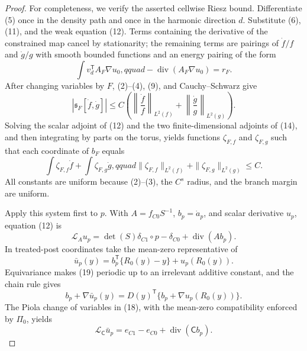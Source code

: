 \documentclass{article}
\begin{document}
\begin{proof}
For completeness, we verify the asserted cellwise Riesz bound.  Differentiate (5) once in the density path and once in the harmonic direction \(d\).  Substitute (6), (11), and the weak equation (12).  Terms containing the derivative of the constrained map cancel by stationarity; the remaining terms are pairings of \(\dot f/f\) and \(\dot g/g\) with smooth bounded functions and an energy pairing of the form
\[
 \int v_d^{\mathsf T}A_F\nabla u_0,qquad
 -\operatorname{div}(A_F\nabla u_0)=r_F.                               \tag{15}
\]
After changing variables by \(F\), (2)--(4), (9), and Cauchy--Schwarz give
\[
 |\mathfrak s_F[\dot f,\dot g]|
 \leq C\left(
 \left\|\frac{\dot f}{f}\right\|_{L^2(f)}+
 \left\|\frac{\dot g}{g}\right\|_{L^2(g)}\right).                  \tag{16}
\]
Solving the scalar adjoint of (12) and the two finite-dimensional adjoints of (14), and then integrating by parts on the torus, yields functions \(\zeta_{F,f}\) and \(\zeta_{F,g}\) such that each coordinate of \(b_F\) equals
\[
 \int\zeta_{F,f}\dot f+\int\zeta_{F,g}\dot g,qquad
 \|\zeta_{F,f}\|_{L^2(f)}+\|\zeta_{F,g}\|_{L^2(g)}\leq C.          \tag{17}
\]
All constants are uniform because (2)--(3), the \(C^s\) radius, and the branch margin are uniform.

Apply this system first to \(p\).  With \(A=f_{C0}S^{-1}\), \(b_p=\dot a_p\), and scalar derivative \(u_p\), equation (12) is
\[
 \mathcal L_Au_p=\det(S)\delta_{C1}\circ p-\delta_{C0}
                 +\operatorname{div}(Ab_p).                            \tag{18}
\]
In treated-post coordinates take the mean-zero representative of
\[
 \bar u_p(y)=b_p^{\mathsf T}\{R_0(y)-y\}+u_p(R_0(y)).                  \tag{19}
\]
Equivariance makes (19) periodic up to an irrelevant additive constant, and the chain rule gives
\[
 b_p+\nabla\bar u_p(y)
 =D(y)^{\mathsf T}\{b_p+\nabla u_p(R_0(y))\}.                          \tag{20}
\]
The Piola change of variables in (18), with the mean-zero compatibility enforced by \(\Pi_0\), yields
\[
 \mathcal L_{\mathsf C}\bar u_p
 =e_{C1}-e_{C0}+\operatorname{div}(\mathsf Cb_p).                       \tag{21}
\]


\end{proof}
\end{document}
